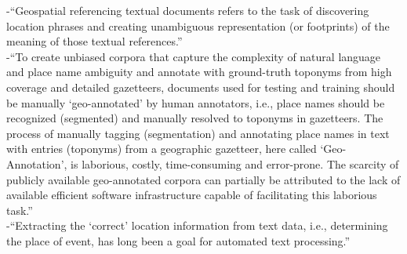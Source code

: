 -{\color{orange}“Geospatial referencing textual documents refers to the task of discovering location phrases and creating unambiguous representation (or footprints) of the meaning of those textual references.”\cite{Cai2016}}\\
-{\color{orange}“To create unbiased corpora that capture the complexity of natural language and place name ambiguity and annotate with ground-truth toponyms from high coverage and detailed gazetteers, documents used for testing and training should be manually ‘geo-annotated’ by human annotators, i.e., place names should be recognized (segmented) and manually resolved to toponyms in gazetteers. The process of manually tagging (segmentation) and annotating place names in text with entries (toponyms) from a geographic gazetteer, here called ‘Geo-Annotation’, is laborious, costly, time-consuming and error-prone. The scarcity of publicly available geo-annotated corpora can partially be attributed to the lack of available efficient software infrastructure capable of facilitating this laborious task.”\cite{Karimzade2019}}\\
-{\color{orange}“Extracting the ‘correct’ location information from text data, i.e., determining the place of event, has long been a goal for automated text processing.”\cite{Lee2019}}\\

